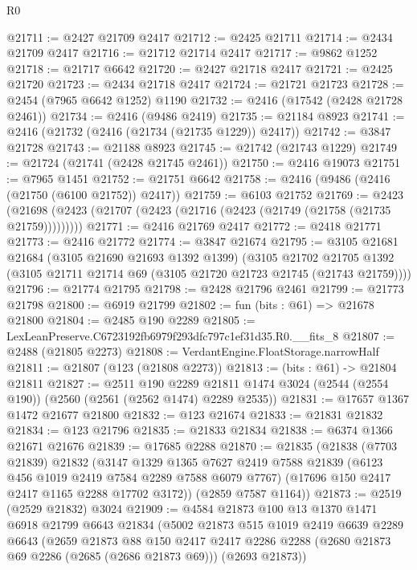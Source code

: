 \begin{lexlean}{R0}
\begin{coremodule}
@21711 := @2427 @21709 @2417
@21712 := @2425 @21711
@21714 := @2434 @21709 @2417
@21716 := @21712 @21714 @2417
@21717 := @9862 @1252
@21718 := @21717 @6642
@21720 := @2427 @21718 @2417
@21721 := @2425 @21720
@21723 := @2434 @21718 @2417
@21724 := @21721 @21723
@21728 := @2454 (@7965 @6642 @1252) @1190
@21732 := @2416 (@17542 (@2428 @21728 @2461))
@21734 := @2416 (@9486 @2419)
@21735 := @21184 @8923
@21741 := @2416 (@21732 (@2416 (@21734 (@21735 @1229)) @2417))
@21742 := @3847 @21728
@21743 := @21188 @8923
@21745 := @21742 (@21743 @1229)
@21749 := @21724 (@21741 (@2428 @21745 @2461))
@21750 := @2416 @19073
@21751 := @7965 @1451
@21752 := @21751 @6642
@21758 := @2416 (@9486 (@2416 (@21750 (@6100 @21752)) @2417))
@21759 := @6103 @21752
@21769 := @2423 (@21698 (@2423 (@21707 (@2423 (@21716 (@2423 (@21749 (@21758 (@21735 @21759)))))))))
@21771 := @2416 @21769 @2417
@21772 := @2418 @21771
@21773 := @2416 @21772
@21774 := @3847 @21674
@21795 := @3105
    @21681
    @21684
    (@3105 @21690 @21693 @1392 @1399)
    (@3105
      @21702
      @21705
      @1392
      (@3105 @21711 @21714 @69 (@3105 @21720 @21723 @21745 (@21743 @21759))))
@21796 := @21774 @21795
@21798 := @2428 @21796 @2461
@21799 := @21773 @21798
@21800 := @6919 @21799
@21802 := fun (bits : @61) => @21678 @21800
@21804 := @2485 @190 @2289
@21805 := LexLeanPreserve.C6723192fb6979f293dfc797c1ef31d35.R0.__fits_8
@21807 := @2488 (@21805 @2273)
@21808 := VerdantEngine.FloatStorage.narrowHalf
@21811 := @21807 (@123 (@21808 @2273))
@21813 := (bits : @61) -> @21804 @21811
@21827 := @2511
    @190
    @2289
    @21811
    @1474
    @3024
    (@2544 (@2554 @190))
    (@2560 (@2561 (@2562 @1474) @2289 @2535))
@21831 := @17657 @1367 @1472 @21677 @21800
@21832 := @123 @21674
@21833 := @21831 @21832
@21834 := @123 @21796
@21835 := @21833 @21834
@21838 := @6374 @1366 @21671 @21676
@21839 := @17685 @2288
@21870 := @21835
    (@21838
      (@7703 @21839)
      @21832
      (@3147
        @1329
        @1365
        @7627
        @2419
        @7588
        @21839
        (@6123 @456 @1019 @2419 @7584 @2289 @7588 @6079 @7767)
        (@17696 @150 @2417 @2417 @1165 @2288 @17702 @3172))
      (@2859 @7587 @1164))
@21873 := @2519 (@2529 @21832) @3024
@21909 := @4584
    @21873
    @100
    @13
    @1370
    @1471
    @6918
    @21799
    @6643
    @21834
    (@5002
      @21873
      @515
      @1019
      @2419
      @6639
      @2289
      @6643
      (@2659
        @21873
        @88
        @150
        @2417
        @2417
        @2286
        @2288
        (@2680 @21873 @69 @2286 (@2685 (@2686 @21873 @69)))
        (@2693 @21873))

\end{coremodule}
\end{lexlean}
